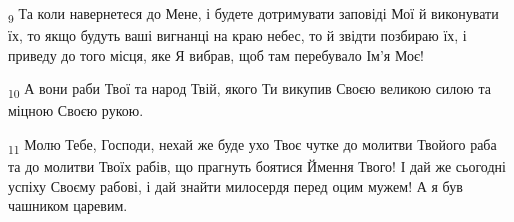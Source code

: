 \begin{tcolorbox}
\textsubscript{9} Та коли навернетеся до Мене, і будете дотримувати заповіді Мої й виконувати їх, то якщо будуть ваші вигнанці на краю небес, то й звідти позбираю їх, і приведу до того місця, яке Я вибрав, щоб там перебувало Ім'я Моє!
\end{tcolorbox}
\begin{tcolorbox}
\textsubscript{10} А вони раби Твої та народ Твій, якого Ти викупив Своєю великою силою та міцною Своєю рукою.
\end{tcolorbox}
\begin{tcolorbox}
\textsubscript{11} Молю Тебе, Господи, нехай же буде ухо Твоє чутке до молитви Твойого раба та до молитви Твоїх рабів, що прагнуть боятися Ймення Твого! І дай же сьогодні успіху Своєму рабові, і дай знайти милосердя перед оцим мужем! А я був чашником царевим.
\end{tcolorbox}
